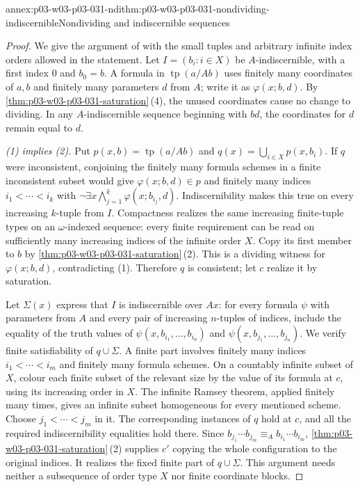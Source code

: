 \begin{annexitem}{annex:p03-w03-p03-031-ndi}{thm:p03-w03-p03-031-nondividing-indiscernible}{Nondividing and indiscernible sequences}
\begin{proof}
We give the argument of \cite[Lemma~3.1, p.~267]{Casanovas2007Simplicity}
with the small tuples and arbitrary infinite index orders allowed in the
statement.  Let \(I=(b_i:i\in X)\) be \(A\)-indiscernible, with a first
index \(0\) and \(b_0=b\).  A formula in \(\operatorname{tp}(a/Ab)\)
uses finitely many coordinates of \(a,b\) and finitely many parameters
\(d\) from \(A\); write it as \(\varphi(x;b,d)\).  By
\cref{thm:p03-w03-p03-031-saturation}\,(4), the unused coordinates cause
no change to dividing.  In any \(A\)-indiscernible sequence beginning
with \(bd\), the coordinates for \(d\) remain equal to \(d\).

\emph{(1) implies (2).}  Put \(p(x,b)=\operatorname{tp}(a/Ab)\) and
\(q(x)=\bigcup_{i\in X}p(x,b_i)\).  If \(q\) were inconsistent,
conjoining the finitely many formula schemes in a finite inconsistent
subset would give \(\varphi(x;b,d)\in p\) and finitely many indices
\(i_1<\cdots<i_k\) with
\(\neg\exists x\bigwedge_{j=1}^k\varphi(x;b_{i_j},d)\).
Indiscernibility makes this true on every increasing \(k\)-tuple from
\(I\).  Compactness realizes the same increasing finite-tuple types on
an \(\omega\)-indexed sequence: every finite requirement can be read
on sufficiently many increasing indices of the infinite order \(X\).
Copy its first member to \(b\) by
\cref{thm:p03-w03-p03-031-saturation}\,(2).  This is a dividing witness
for \(\varphi(x;b,d)\), contradicting (1).  Therefore \(q\) is
consistent; let \(c\) realize it by saturation.

Let \(\Sigma(x)\) express that \(I\) is indiscernible over \(Ax\):
for every formula \(\psi\) with parameters from \(A\) and every pair of
increasing \(n\)-tuples of indices, include the equality of the truth
values of \(\psi(x,b_{i_1},\ldots,b_{i_n})\) and
\(\psi(x,b_{j_1},\ldots,b_{j_n})\).  We verify finite satisfiability of
\(q\cup\Sigma\).  A finite part involves finitely many indices
\(i_1<\cdots<i_m\) and finitely many formula schemes.  On a countably
infinite subset of \(X\), colour each finite subset of the relevant
size by the value of its formula at \(c\), using its increasing order
in \(X\).  The infinite Ramsey theorem, applied finitely many times,
gives an infinite subset homogeneous for every mentioned scheme.  Choose
\(j_1<\cdots<j_m\) in it.  The corresponding instances of \(q\) hold
at \(c\), and all the required indiscernibility equalities hold there.
Since \(b_{j_1}\cdots b_{j_m}\equiv_A b_{i_1}\cdots b_{i_m}\),
\cref{thm:p03-w03-p03-031-saturation}\,(2) supplies \(c'\) copying the
whole configuration to the original indices.  It realizes the fixed
finite part of \(q\cup\Sigma\).  This argument needs neither a
subsequence of order type \(X\) nor finite coordinate blocks.


\end{proof}
\end{annexitem}
